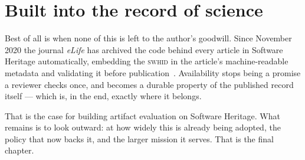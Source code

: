 \section{Built into the record of science}

Best of all is when none of this is left to the author's goodwill. Since November 2020 the journal
\emph{eLife} has archived the code behind every article in Software Heritage automatically, embedding
the \textsc{swhid} in the article's machine-readable metadata and validating it before
publication~\autocite{elifeswh2020}. Availability stops being a promise a reviewer checks once, and
becomes a durable property of the published record itself --- which is, in the end, exactly where it
belongs.

That is the case for building artifact evaluation on Software Heritage. What remains is to look
outward: at how widely this is already being adopted, the policy that now backs it, and the larger
mission it serves. That is the final chapter.
